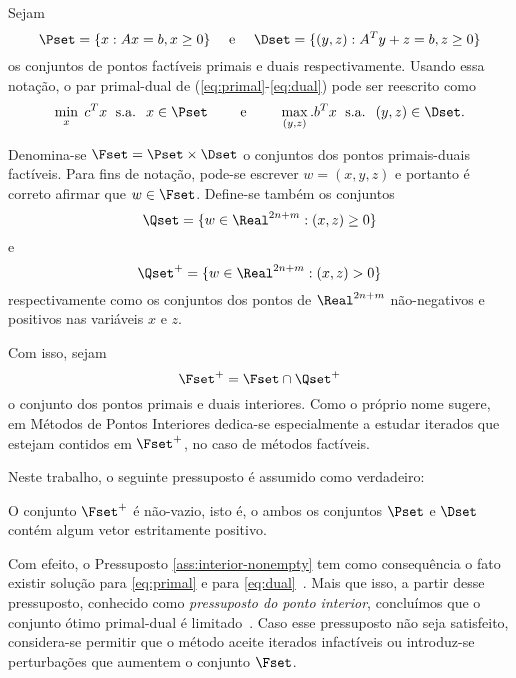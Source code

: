 Sejam
\begin{equation}
\label{eq:primal-dual-feas-set}
\Pset = \{x : Ax = b, x\geq 0\} \quad\text{ e } \quad
\Dset = \{ (y,z) : A^Ty + z = b, z\geq 0\}
\end{equation}
 os conjuntos de pontos factíveis primais e duais 
respectivamente. Usando essa notação, o par primal-dual de
(\ref{eq:primal}-\ref{eq:dual}) pode ser reescrito como
\begin{equation}
\label{eq:primal-dual-reescrito}
\min_x\; c^Tx \; \text{ s.a. }\; x\in \Pset \qquad\text{ e } \qquad
\max_{(y,z)}.
b^Tx \; \text{ s.a. }\; (y,z) \in \Dset.
\end{equation}


Denomina-se $\Fset = \Pset\times\Dset$ o conjuntos dos pontos primais-duais
factíveis.
 Para fins de notação, pode-se escrever $w = (x,y,z)$ e portanto é correto
 afirmar que $w\in\Fset$. Define-se também os conjuntos \[ \Qset =
 \{w\in\Real^{2n+m}:(x,z)\geq 0\} \] e \[ \Qset^+ = \{w\in\Real^{2n+m}:(x,z) >
 0\} \] respectivamente  como os
conjuntos dos pontos de $\Real^{2n+m}$ não-negativos e positivos nas variáveis
$x$ e $z$.



Com isso, sejam  
\[  \Fset^+ = \Fset \cap \Qset^+\] o conjunto dos
pontos primais e duais interiores. Como o próprio nome sugere, em Métodos de 
Pontos Interiores dedica-se especialmente a estudar iterados que estejam
contidos em $\Fset^+$, no caso de métodos factíveis.


Neste trabalho, o seguinte pressuposto é assumido como verdadeiro:

\begin{pressup}\label{ass:interior-nonempty}
 O conjunto $\Fset^+$ é não-vazio, isto é, o ambos os conjuntos $\Pset$ e
 $\Dset$ contém algum vetor estritamente positivo.
\end{pressup}


%  

Com efeito,   o Pressuposto \ref{ass:interior-nonempty} tem como
consequência o fato existir  solução para
\eqref{eq:primal} e para \eqref{eq:dual}~\cite[Teorema 3.1]{Guler:1995wf}.
Mais que isso, a partir desse pressuposto, conhecido como \emph{pressuposto do
ponto interior}, concluímos que o conjunto ótimo primal-dual  é
limitado~\cite[Lema 2.2]{Guler:1995tn}.  Caso
esse pressuposto não seja satisfeito, considera-se permitir que o método aceite
iterados infactíveis ou introduz-se perturbações que aumentem o conjunto
$\Fset$.

